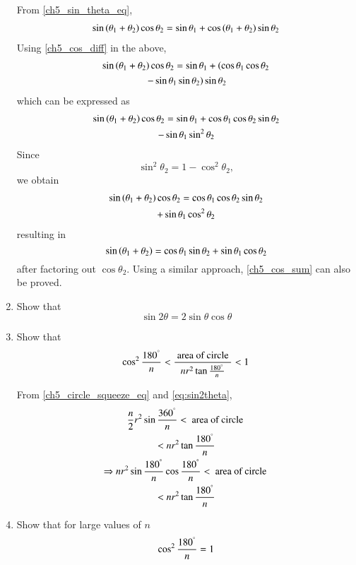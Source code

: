 \begin{enumerate}[label=\arabic*.,ref=\thesubsection.\theenumi]
%
\solution From \eqref{ch5_sin_theta_eq},
%
\begin{align}
 \sin \left(\theta_1 + \theta_2\right)\cos \theta_2 =\sin  \theta_1 +\cos\left(\theta_1+\theta_2\right)\sin\theta_2 
\end{align}
%
Using \eqref{ch5_cos_diff} in the above,
%
\begin{multline}
\sin \left(\theta_1 + \theta_2\right)\cos \theta_2 
=\sin  \theta_1 +\left(\cos \theta_1\cos\theta_2 \right.
\\	
\left.	- \sin \theta_1\sin\theta_2\right)\sin\theta_2 
\end{multline}
%
which can be expressed as
%
\begin{multline}
\sin \left(\theta_1 + \theta_2\right)\cos \theta_2 
=\sin  \theta_1 +\cos \theta_1\cos\theta_2 \sin\theta_2 
\\	
	- \sin \theta_1\sin^2\theta_2
\end{multline}
%
Since
%
\begin{equation}
\sin^2\theta_2 = 1- \cos^2\theta_2, 
\end{equation}
%
we obtain
%
\begin{multline}
\sin \left(\theta_1 + \theta_2\right)\cos \theta_2 
=\cos \theta_1\cos\theta_2 \sin\theta_2 
\\	
+ \sin \theta_1\cos^2\theta_2
\end{multline}
%
resulting in
%
\begin{equation}
\sin \left(\theta_1 + \theta_2\right)
=\cos \theta_1 \sin\theta_2 
+ \sin \theta_1\cos\theta_2
\end{equation}
%
after factoring out $\cos \theta_2$.  Using a similar approach, \eqref{ch5_cos_sum} can also be proved.
%
\item
	Show that
	\begin{equation}
	\label{eq:sin2theta}
	\sin 2\theta = 2 \sin\theta \cos\theta
	\end{equation}

\item
Show that
	\begin{equation}
	\label{ch5_circle_squeeze_simple}
\cos^2\frac{180^{\degree}}{n} < \frac{\text{ area of circle }}{nr^{2}\tan\frac{180^{\degree}}{n}} < 1	\end{equation}

\solution From \eqref{ch5_circle_squeeze_eq} and \eqref{eq:sin2theta},
	\begin{multline}
	\frac{n}{2}r^{2}\sin\frac{360^{\degree}}{n} < \text{ area of circle } 
	\\
	< nr^{2}\tan\frac{180^{\degree}}{n} 
	\\
\Rightarrow 	
	{n}r^{2}\sin\frac{180^{\degree}}{n}\cos\frac{180^{\degree}}{n} < \text{ area of circle } 
	\\
	< nr^{2}\tan\frac{180^{\degree}}{n} 
	\end{multline}
%
%
\item
	Show that for large values of $n$
	\begin{equation}
\cos^2\frac{180^{\degree}}{n} = 1
%
	\end{equation}	


\end{enumerate}
